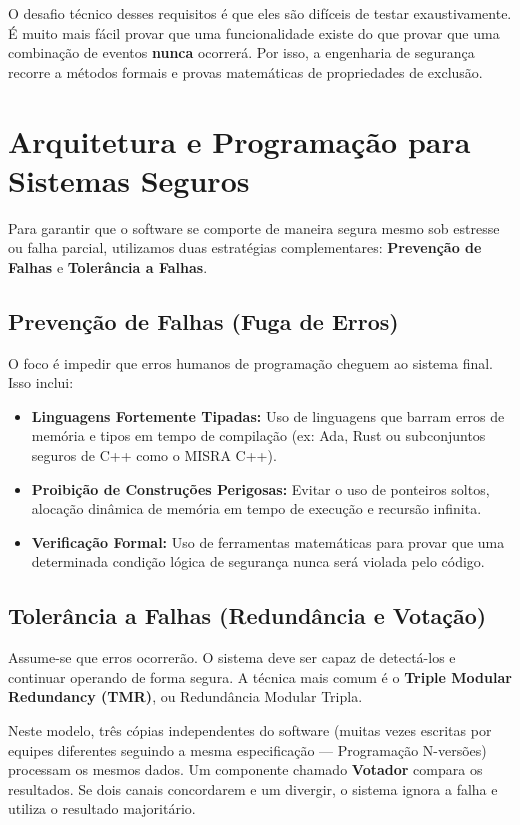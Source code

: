 \documentclass[12pt,a4paper]{report}
\begin{document}
O desafio técnico desses requisitos é que eles são difíceis de testar exaustivamente. É muito mais fácil provar que uma funcionalidade existe do que provar que uma combinação de eventos \textbf{nunca} ocorrerá. Por isso, a engenharia de segurança recorre a métodos formais e provas matemáticas de propriedades de exclusão.

\section{Arquitetura e Programação para Sistemas Seguros}

Para garantir que o software se comporte de maneira segura mesmo sob estresse ou falha parcial, utilizamos duas estratégias complementares: \textbf{Prevenção de Falhas} e \textbf{Tolerância a Falhas}.

\subsection{Prevenção de Falhas (Fuga de Erros)}
O foco é impedir que erros humanos de programação cheguem ao sistema final. Isso inclui:
\begin{itemize}
    \item \textbf{Linguagens Fortemente Tipadas:} Uso de linguagens que barram erros de memória e tipos em tempo de compilação (ex: Ada, Rust ou subconjuntos seguros de C++ como o MISRA C++).
    \item \textbf{Proibição de Construções Perigosas:} Evitar o uso de ponteiros soltos, alocação dinâmica de memória em tempo de execução e recursão infinita.
    \item \textbf{Verificação Formal:} Uso de ferramentas matemáticas para provar que uma determinada condição lógica de segurança nunca será violada pelo código.
\end{itemize}

\subsection{Tolerância a Falhas (Redundância e Votação)}
Assume-se que erros ocorrerão. O sistema deve ser capaz de detectá-los e continuar operando de forma segura. A técnica mais comum é o \textbf{Triple Modular Redundancy (TMR)}, ou Redundância Modular Tripla.

Neste modelo, três cópias independentes do software (muitas vezes escritas por equipes diferentes seguindo a mesma especificação --- Programação N-versões) processam os mesmos dados. Um componente chamado \textbf{Votador} compara os resultados. Se dois canais concordarem e um divergir, o sistema ignora a falha e utiliza o resultado majoritário.
\end{document}
